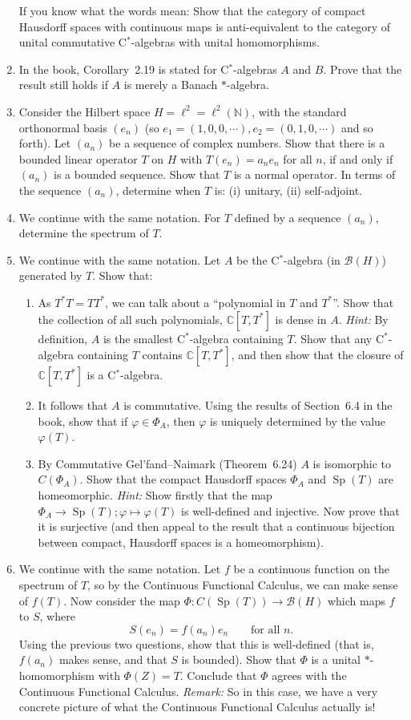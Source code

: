 \documentclass[twoside,12pt,a4paper]{article}
\newcommand{\Sp}{\operatorname{Sp}}
\begin{document}
\begin{enumerate}
If you know what the words mean: Show that the category of compact Hausdorff
spaces with continuous maps is anti-equivalent to the category of
unital commutative C$^*$-algebras with unital homomorphisms.
\item In the book, Corollary~2.19 is stated for C$^*$-algebras $A$ and $B$.
Prove that the result still holds if $A$ is merely a Banach $*$-algebra.
\item Consider the Hilbert space $H = \ell^2 = \ell^2(\mathbb N)$, with the
standard orthonormal basis $(e_n)$ (so $e_1=(1,0,0,\cdots), e_2=(0,1,0,\cdots)$
and so forth).  Let $(a_n)$ be a sequence of complex numbers.  Show that
there is a bounded linear operator $T$ on $H$ with $T(e_n) = a_n e_n$ for
all $n$, if and only if $(a_n)$ is a bounded sequence.  Show that $T$ is
a normal operator.  In terms of the sequence $(a_n)$, determine when $T$ is:
(i) unitary, (ii) self-adjoint.
\item We continue with the same notation.  For $T$ defined by a
sequence $(a_n)$, determine the spectrum of $T$.
\item We continue with the same notation.  Let $A$ be the C$^*$-algebra
(in $\mathcal B(H)$) generated by $T$.  Show that:
\begin{enumerate}
\item As $T^*T = TT^*$, we can talk about a ``polynomial in $T$ and $T^*$''.
Show that the collection of all such polynomials, $\mathbb C[T,T^*]$ is
dense in $A$. \emph{Hint:} By definition, $A$ is the smallest C$^*$-algebra
containing $T$.  Show that any C$^*$-algebra containing $T$ contains
$\mathbb C[T,T^*]$, and then show that the closure of $\mathbb C[T,T^*]$
is a C$^*$-algebra.
\item It follows that $A$ is commutative.  Using the results of Section~6.4
in the book, show that if $\varphi\in\Phi_A$, then $\varphi$ is uniquely
determined by the value $\varphi(T)$.
\item By Commutative Gel'fand--Naimark (Theorem~6.24) $A$ is isomorphic to
$C(\Phi_A)$.  Show that the compact Hausdorff spaces $\Phi_A$ and $\Sp(T)$
are homeomorphic.
\emph{Hint:} Show firstly that the map $\Phi_A\rightarrow \Sp(T);
\varphi\mapsto\varphi(T)$ is well-defined and injective.  Now prove that
it is surjective (and then appeal to the result that a continuous bijection
between compact, Hausdorff spaces is a homeomorphism).
\end{enumerate}
\item We continue with the same notation.  Let $f$ be a continuous function
on the spectrum of $T$, so by the Continuous Functional Calculus, we can
make sense of $f(T)$.  Now consider the map $\Phi:C(\Sp(T)) \rightarrow
\mathcal B(H)$ which maps $f$ to $S$, where
\[ S(e_n) = f(a_n) e_n \qquad \text{for all $n$}. \]
Using the previous two questions, show that this is well-defined
(that is, $f(a_n)$ makes sense, and that $S$ is bounded).  Show that $\Phi$
is a unital $*$-homomorphism with $\Phi(Z)=T$.  Conclude that $\Phi$ agrees
with the Continuous Functional Calculus.
\emph{Remark:} So in this case, we have a very concrete picture of what
the Continuous Functional Calculus actually is!
\end{enumerate}
\end{document}
